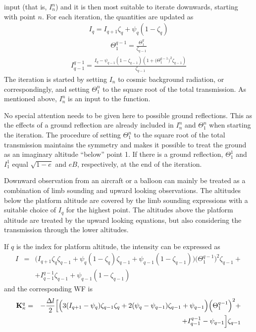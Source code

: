  input (that is, $I_n^n$) and it is then most suitable to iterate
 downwards, starting with point $n$. For each iteration, the
 quantities are updated as
 \begin{eqnarray}
   I_q = I_{q+1}\zeta_q + \psi_q(1-\zeta_q) \nonumber
 \end{eqnarray}
 \begin{eqnarray}
   \Theta_{1}^{q-1} =  \frac{\Theta_{1}^{q}}{\zeta_{q-1}} \nonumber
 \end{eqnarray}
 \begin{eqnarray}
   I_{q-1}^{q-1} = \frac{I_q - \psi_{q-1}(1-\zeta_{q-1})
       (1+\big(\Theta^{q-1}_{1}\big)^2\zeta_{q-1})}{\zeta_{q-1}} \nonumber
 \end{eqnarray}
 The iteration is started by setting $I_n$ to cosmic
 background radiation, or correspondingly, and setting
 $\Theta^n_1$ to the square root of the total transmission. As
 mentioned above, $I_n^n$ is an input to the function.
 
 No special attention needs to be given here to possible ground
 reflections.  This as the effects of a ground reflection are already
 included in $I_n^n$ and $\Theta^n_1$ when starting the iteration. The
 procedure of setting $\Theta^n_1$ to the square root of the total
 transmission maintains the symmetry and makes it possible to treat
 the ground as an imaginary altitude ``below'' point 1. If there is a
 ground reflection, $\Theta^1_1$ and $I_1^1$ equal $\sqrt{1-e}$ and
 $eB$, respectively, at the end of the iteration.


 

  \label{sec:wfuns:down}
  Downward observation from an aircraft or a balloon can mainly be
  treated as a combination of limb sounding and upward looking
  observations.  The altitudes below the platform altitude are covered
  by the limb sounding expressions with a suitable choice of $I_q$ for
  the highest point. The altitudes above the platform altitude are
  treated by the upward looking equations, but also considering the
  transmission through the lower altitudes. 
  
  If $q$ is the index for platform altitude, the intensity can be
  expressed as
  \begin{eqnarray}
   I &=& \Big(I_{q+1}\zeta_q\zeta_{q-1} +\psi_q(1-\zeta_q)\zeta_{q-1} + 
           \psi_{q-1}(1-\zeta_{q-1})\Big)\Big(\Theta^{q-1}_{1}\Big)^2
           \zeta_{q-1} + \nonumber \\
      & & + I_{q-1}^{q-1}\zeta_{q-1} + \psi_{q-1}(1-\zeta_{q-1})
    \label{eq:wfuns:idown}
  \end{eqnarray}
  and the corresponding WF is
  \begin{eqnarray}
   \mathbf{K}_{\kappa}^q& = & -\frac{\Delta l}{2}\Big[\Big(3(I_{q+1}-\psi_q)
           \zeta_{q-1}\zeta_q+ 2(\psi_q-\psi_{q-1})\zeta_{q-1} + \psi_{q-1} \Big)
           \Big(\Theta^{q-1}_{1}\Big)^2 + \nonumber \\
      & &  + I_{q-1}^{q-1}-\psi_{q-1}\Big]\zeta_{q-1}
  \end{eqnarray}



